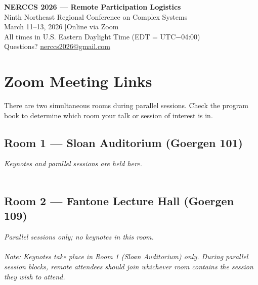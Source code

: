 \documentclass[11pt]{article}
\begin{document}
\begin{center}
    {\LARGE\bfseries NERCCS 2026 — Remote Participation Logistics}\\[0.5em]
    {\large Ninth Northeast Regional Conference on Complex Systems}\\[0.3em]
    {\normalsize March 11--13, 2026 \quad|\quad Online via Zoom}\\[0.3em]
    {\normalsize All times in U.S. Eastern Daylight Time (EDT = UTC$-$04:00)}\\[0.3em]
    {\normalsize Questions? \href{mailto:nerccs2026@gmail.com}{nerccs2026@gmail.com}}
\end{center}

\vspace{1em}

\section{Zoom Meeting Links}

There are two simultaneous rooms during parallel sessions.
Check the program book to determine which room your talk or session of interest is in.

\subsection{Room 1 — Sloan Auditorium (Goergen 101)}
\textit{Keynotes and parallel sessions are held here.}\\[0.5em]
\\

\subsection{Room 2 — Fantone Lecture Hall (Goergen 109)}
\textit{Parallel sessions only; no keynotes in this room.}\\[0.5em]
\\


\vspace{0.5em}
\noindent\textit{Note: Keynotes take place in Room 1 (Sloan Auditorium) only.
During parallel session blocks, remote attendees should join whichever room contains the session they wish to attend.}
\end{document}
